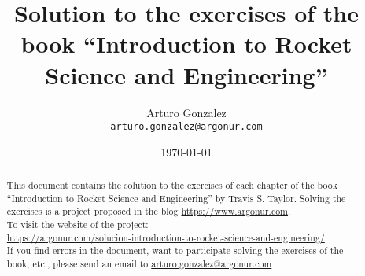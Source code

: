 \documentclass{article}
\begin{document}
\title{Solution to the exercises of the book ``Introduction to Rocket Science and Engineering''}
\author{Arturo Gonzalez\\
	\texttt{\href{mailto:arturo.gonzalez@argonur.com}{arturo.gonzalez@argonur.com}}}
\date{\today}
\maketitle

\begin{abstract}
This document contains the solution to the exercises of each chapter of the book ``Introduction to Rocket Science and Engineering'' by Travis S. Taylor. Solving the exercises is a project proposed in the blog \url{https://www.argonur.com}.\\

To visit the website of the project: \\
\url{https://argonur.com/solucion-introduction-to-rocket-science-and-engineering/}.\\

If you find errors in the document, want to participate solving the exercises of the book, etc., please send an email to \href{mailto:arturo.gonzalez@argonur.com}{arturo.gonzalez@argonur.com}
\end{abstract}

\cleardoublepage




\cleardoublepage




\cleardoublepage
\end{document}
